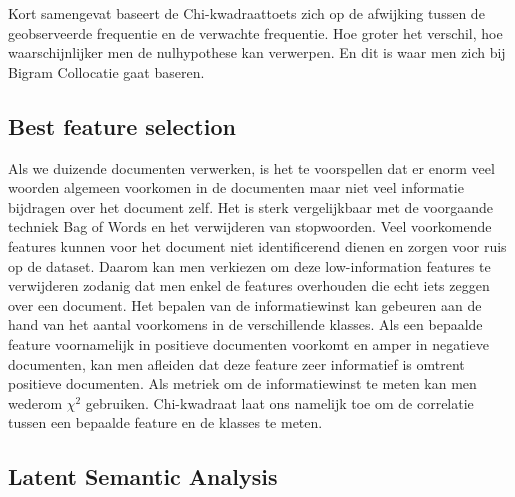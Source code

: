 Kort samengevat baseert de Chi-kwadraattoets zich op de afwijking tussen de geobserveerde frequentie en de verwachte frequentie. Hoe groter het verschil, hoe waarschijnlijker men de nulhypothese kan verwerpen. En dit is waar men zich bij Bigram Collocatie gaat baseren.

\subsection{Best feature selection}\label{Low-information feature selection selection}

Als we duizende documenten verwerken, is het te voorspellen dat er enorm veel woorden algemeen voorkomen in de documenten maar niet veel informatie bijdragen over het document zelf. Het is sterk vergelijkbaar met de voorgaande techniek Bag of Words en het verwijderen van stopwoorden. Veel voorkomende features kunnen voor het document niet identificerend dienen en zorgen voor ruis op de dataset. Daarom kan men verkiezen om deze low-information features te verwijderen zodanig dat men enkel de features overhouden die echt iets zeggen over een document. Het bepalen van de informatiewinst kan gebeuren aan de hand van het aantal voorkomens in de verschillende klasses. Als een bepaalde feature voornamelijk in positieve documenten voorkomt en amper in negatieve documenten, kan men afleiden dat deze feature zeer informatief is omtrent positieve documenten. Als metriek om de informatiewinst te meten kan men wederom ${\chi}^2$ gebruiken. Chi-kwadraat laat ons namelijk toe om de correlatie tussen een bepaalde feature en de klasses te meten.
%
\subsection{Latent Semantic Analysis}\label{Latent Semantic Analysis}

